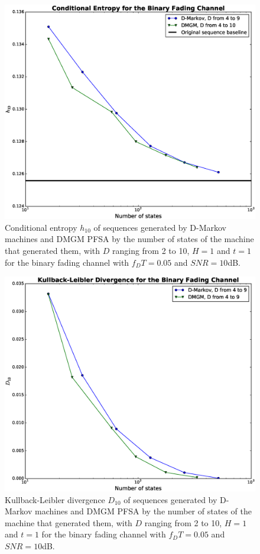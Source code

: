 {\begin{figure}[h]
\centering
\includegraphics[scale=0.35]{Figuras/10dbq1_h_mk4.eps}
\caption{Conditional entropy $h_{10}$ of sequences generated by D-Markov machines and DMGM PFSA by the number of states of the machine that generated them, with $D$ ranging from 2 to 10, $H=1$ and $t=1$ for the binary fading channel with $f_DT = 0.05$ and $SNR = 10$dB.\label{fig:10dbq1h}}
\end{figure}

\begin{figure}[h]
\centering
\includegraphics[scale=0.35]{Figuras/10dbq1_kld_mk4.eps}
\caption{Kullback-Leibler divergence $D_{10}$ of sequences generated by D-Markov machines and DMGM PFSA by the number of states of the machine that generated them, with $D$ ranging from 2 to 10, $H=1$ and $t=1$ for the binary fading channel with $f_DT = 0.05$ and $SNR = 10$dB.\label{fig:10dbq1kld}}
\end{figure}

}
